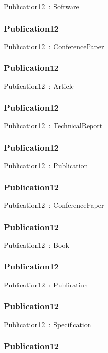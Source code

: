 \documentclass{article}
\begin{document}
Publication12~:~Software

\subsubsection*{Publication12}

Publication12~:~ConferencePaper

\subsubsection*{Publication12}

Publication12~:~Article

\subsubsection*{Publication12}

Publication12~:~TechnicalReport

\subsubsection*{Publication12}

Publication12~:~Publication

\subsubsection*{Publication12}

Publication12~:~ConferencePaper

\subsubsection*{Publication12}

Publication12~:~Book

\subsubsection*{Publication12}

Publication12~:~Publication

\subsubsection*{Publication12}

Publication12~:~Specification

\subsubsection*{Publication12}
\end{document}
